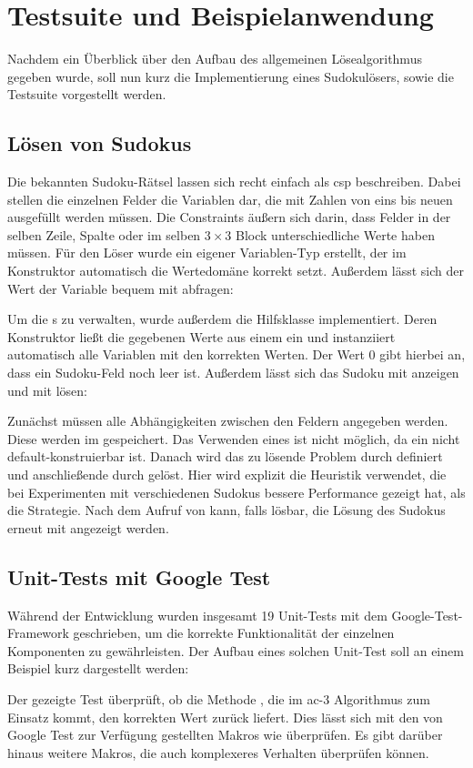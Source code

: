 \section{Testsuite und Beispielanwendung}
Nachdem ein Überblick über den Aufbau des allgemeinen Lösealgorithmus gegeben wurde, soll nun kurz die Implementierung eines Sudokulösers, sowie die Testsuite vorgestellt werden.

\subsection{Lösen von Sudokus}
Die bekannten Sudoku-Rätsel lassen sich recht einfach als \ac*{csp} beschreiben. Dabei stellen die einzelnen Felder die Variablen dar, die mit Zahlen von eins bis neuen ausgefüllt
werden müssen. Die Constraints äußern sich darin, dass Felder in der selben Zeile, Spalte oder im selben $3 \times 3$ Block unterschiedliche Werte haben müssen. Für den Löser wurde
ein eigener Variablen-Typ erstellt, der im Konstruktor automatisch die Wertedomäne korrekt setzt. Außerdem lässt sich der Wert der Variable bequem mit  abfragen:

Um die s zu verwalten, wurde außerdem die Hilfsklasse  implementiert. Deren Konstruktor ließt die gegebenen Werte aus einem 
ein und instanziiert automatisch alle Variablen mit den korrekten Werten. Der Wert 0 gibt hierbei an, dass ein Sudoku-Feld noch leer ist. Außerdem lässt sich das Sudoku mit
 anzeigen und mit  lösen:

Zunächst müssen alle Abhängigkeiten zwischen den Feldern angegeben werden. Diese werden im  gespeichert. Das Verwenden eines  ist
nicht möglich, da ein  nicht default-konstruierbar ist. Danach wird das zu lösende Problem durch  definiert und anschließende durch
 gelöst. Hier wird explizit die Heuristik  verwendet, die bei Experimenten mit verschiedenen Sudokus bessere Performance gezeigt
hat, als die  Strategie. Nach dem Aufruf von  kann, falls lösbar, die Lösung des Sudokus erneut mit  angezeigt werden.

\subsection{Unit-Tests mit Google Test}
Während der Entwicklung wurden insgesamt 19 Unit-Tests mit dem Google-Test-Framework geschrieben, um die korrekte Funktionalität der einzelnen Komponenten zu gewährleisten.
Der Aufbau eines solchen Unit-Test soll an einem Beispiel kurz dargestellt werden:

Der gezeigte Test überprüft, ob die Methode , die im \ac*{ac}-3 Algorithmus zum Einsatz kommt, den korrekten Wert zurück liefert. Dies lässt
sich mit den von Google Test zur Verfügung gestellten Makros wie  überprüfen. Es gibt darüber hinaus weitere Makros, die auch komplexeres Verhalten überprüfen
können.
